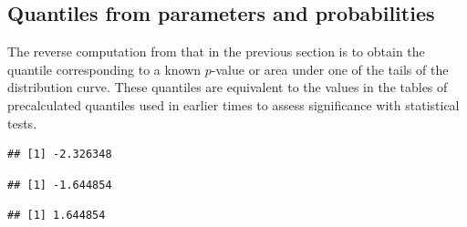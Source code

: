\documentclass[krantz2]{krantz}\usepackage{knitr}
\begin{document}
\subsection{Quantiles from parameters and probabilities}\label{sec:quant:prob}

The reverse computation from that in the previous section is to obtain the quantile corresponding to a known $p$-value or area under one of the tails of the distribution curve. These quantiles are equivalent to the values in the tables of precalculated quantiles used in earlier times to assess significance with statistical tests.

\begin{knitrout}\footnotesize
{}\color{fgcolor}\begin{kframe}
\begin{alltt}
\hlstd{(} \hlstd{=} \hlstd{,}  \hlstd{=} \hlstd{,}  \hlstd{=} \hlstd{)}
\end{alltt}
\begin{verbatim}
## [1] -2.326348
\end{verbatim}
\begin{alltt}
\hlstd{(} \hlstd{=} \hlstd{,}  \hlstd{=} \hlstd{,}  \hlstd{=} \hlstd{)}
\end{alltt}
\begin{verbatim}
## [1] -1.644854
\end{verbatim}
\begin{alltt}
\hlstd{(} \hlstd{=} \hlstd{,}  \hlstd{=} \hlstd{,}  \hlstd{=} \hlstd{,}  \hlstd{=} \hlstd{)}
\end{alltt}
\begin{verbatim}
## [1] 1.644854
\end{verbatim}
\end{kframe}
\end{knitrout}
\end{document}
